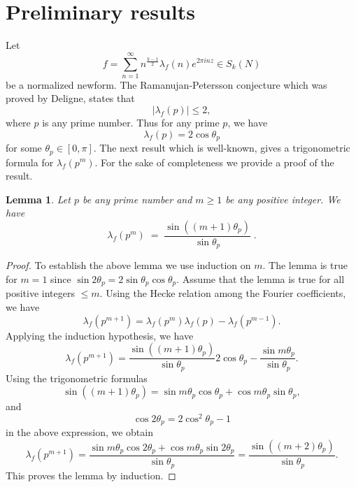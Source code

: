 \documentclass[12pt,a4paper,reqno]{amsart}
\newtheorem{lemma}[theorem]{Lemma}
\begin{document}
\section{Preliminary results}

Let 
$$f=\sum_{n=1}^{\infty}n^{\frac{k-1}{2}}\lambda_f(n)e^{2\pi inz}\in S_k(N)$$ 
be a normalized newform. 
The Ramanujan-Petersson conjecture which was proved by Deligne, states that
$$|\lambda_f(p)|\le 2,$$ 
where $p$ is any prime number.
Thus for any prime  $p$, we have
$$
\lambda_f(p)= 2\cos{\theta_p}
$$
for some $\theta_p\in [0,\pi]$. The next result which is well-known, gives a trigonometric formula for 
$\lambda_f(p^m)$. For the sake of completeness we provide a proof of the result.

\begin{lemma}\label{lemma:lambdaformula}
Let $p$ be any prime number and $m\geq 1$ be any positive integer. We have
\begin{equation}\label{eq:lambdapm}
\lambda_f(p^m)\;=\; \frac{\sin{((m+1)\theta_p)}}{\sin{\theta_p}}\; .
\end{equation}
\end{lemma}

\begin{proof}
To establish the above lemma we use induction on $m$. The lemma is true for $m=1$ since
$\sin{2\theta_p}=2 \sin{\theta_p}\cos{\theta_p}$.
Assume that the lemma is true for all positive integers $\le m$. 
Using the Hecke relation among the Fourier coefficients, we have
$$
\lambda_f(p^{m+1})=\lambda_f(p^m)\lambda_f(p)-\lambda_f(p^{m-1}).
$$
Applying the induction hypothesis, we have
$$
\lambda_f(p^{m+1})=\frac{\sin{((m+1)\theta_p)}}{\sin{\theta_p}}
2\cos{\theta_p}-\frac{\sin{m\theta_p}}{\sin{\theta_p}}.
$$
Using the trigonometric formulas 
$$\sin{((m+1)\theta_p)}=\sin{m\theta_p}\cos{\theta_p}+\cos{m\theta_p}\sin{\theta_p},$$
and
$$
\cos{2\theta_p}=2\cos^2{\theta_p}-1
$$ 
in the above expression, we obtain
$$
\lambda_f(p^{m+1})=\frac{\sin{m\theta_p}\cos{2\theta_p}+
\cos{m\theta_p}\sin{2\theta_p}}{\sin{\theta_p}}=\frac{\sin{((m+2)\theta_p)}}{\sin{\theta_p}}.
$$
This proves the lemma by induction.
\end{proof}
\end{document}
